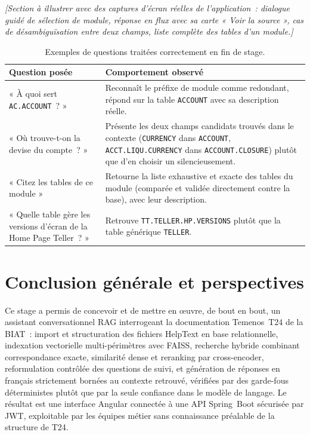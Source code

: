 ﻿\documentclass[12pt,a4paper]{report}
\newcommand{\code}[1]{\texttt{\color{biatbluedk}#1}}
\newcommand{\ph}[1]{\textit{\color{mutedgray}[#1]}}
\begin{document}
\ph{Section à illustrer avec des captures d'écran réelles de l'application~: dialogue guidé de sélection de module, réponse en flux avec sa carte « Voir la source », cas de désambiguïsation entre deux champs, liste complète des tables d'un module.}

\begin{table}[h]
\centering
\small
\caption{Exemples de questions traitées correctement en fin de stage.}
\begin{tabular}{@{}p{5.5cm}p{7cm}@{}}
\toprule
\textbf{Question posée} & \textbf{Comportement observé} \\
\midrule
« À quoi sert \code{AC.ACCOUNT}~? » & Reconnaît le préfixe de module comme redondant, répond sur la table \code{ACCOUNT} avec sa description réelle. \\
« Où trouve-t-on la devise du compte~? » & Présente les deux champs candidats trouvés dans le contexte (\code{CURRENCY} dans \code{ACCOUNT}, \code{ACCT.LIQU.CURRENCY} dans \code{ACCOUNT.CLOSURE}) plutôt que d'en choisir un silencieusement. \\
« Citez les tables de ce module » & Retourne la liste exhaustive et exacte des tables du module (comparée et validée directement contre la base), avec leur description. \\
« Quelle table gère les versions d'écran de la Home Page Teller~? » & Retrouve \code{TT.TELLER.HP.VERSIONS} plutôt que la table générique \code{TELLER}. \\
\bottomrule
\end{tabular}
\end{table}

\chapter*{Conclusion générale et perspectives}

Ce stage a permis de concevoir et de mettre en œuvre, de bout en bout, un assistant conversationnel RAG interrogeant la documentation Temenos~T24 de la BIAT~: import et structuration des fichiers HelpText en base relationnelle, indexation vectorielle multi-périmètres avec FAISS, recherche hybride combinant correspondance exacte, similarité dense et reranking par cross-encoder, reformulation contrôlée des questions de suivi, et génération de réponses en français strictement bornées au contexte retrouvé, vérifiées par des garde-fous déterministes plutôt que par la seule confiance dans le modèle de langage. Le résultat est une interface Angular connectée à une API Spring~Boot sécurisée par JWT, exploitable par les équipes métier sans connaissance préalable de la structure de T24.
\end{document}
